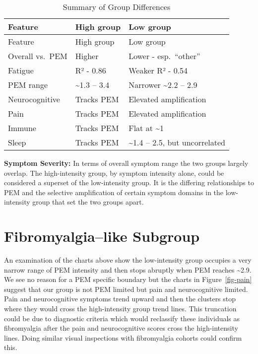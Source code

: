 \documentclass[
  letterpaper,
  DIV=11,
  numbers=noendperiod]{scrartcl}
\begin{document}
\begin{longtable}[]{@{}lll@{}}
\caption{Summary of Group Differences}\label{tbl-t1}\tabularnewline
\toprule\noalign{}
Feature & High group & Low group \\
\midrule\noalign{}
\endfirsthead
\toprule\noalign{}
Feature & High group & Low group \\
\midrule\noalign{}
\endhead
\bottomrule\noalign{}
\endlastfoot
Overall vs.~PEM & Higher & Lower - esp.~``other'' \\
Fatigue & R² - 0.86 & Weaker R² - 0.54 \\
PEM range & \textasciitilde1.3 -- 3.4 & Narrower \textasciitilde2.2 --
2.9 \\
Neurocognitive & Tracks PEM & Elevated amplification \\
Pain & Tracks PEM & Elevated amplification \\
Immune & Tracks PEM & Flat at \textasciitilde1 \\
Sleep & Tracks PEM & \textasciitilde1.4 -- 2.5, but uncorrelated \\
\end{longtable}

\bigskip

\textbf{Symptom Severity:} In terms of overall symptom range the two
groups largely overlap. The high-intensity group, by symptom intensity
alone, could be considered a superset of the low-intensity group. It is
the differing relationships to PEM and the selective amplification of
certain symptom domains in the low-intensity group that set the two
groups apart.

\section{Fibromyalgia--like Subgroup}\label{fibromyalgialike-subgroup}

An examination of the charts above show the low-intensity group occupies
a very narrow range of PEM intensity and then stops abruptly when PEM
reaches \textasciitilde2.9. We see no reason for a PEM specific boundary
but the charts in Figure~\ref{fig-pain} suggest that our group is not
PEM limited but pain and neurocognitive limited. Pain and neurocognitive
symptoms trend upward and then the clusters stop where they would cross
the high-intensity group trend lines. This truncation could be due to
diagnostic criteria which would reclassify these individuals as
fibromyalgia after the pain and neurocognitive scores cross the
high-intensity lines. Doing similar visual inspections with fibromyalgia
cohorts could confirm this.
\end{document}
